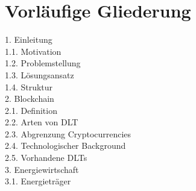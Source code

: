 \section{Vorläufige Gliederung}
1. Einleitung\\
1.1. Motivation\\
1.2. Problemstellung\\
1.3. Lösungsansatz\\
1.4. Struktur\\
2. Blockchain\\
2.1. Definition\\
2.2. Arten von DLT\\
2.3. Abgrenzung Cryptocurrencies\\
2.4. Technologischer Background\\
2.5. Vorhandene DLTs\\
3. Energiewirtschaft\\
3.1. Energieträger\\
